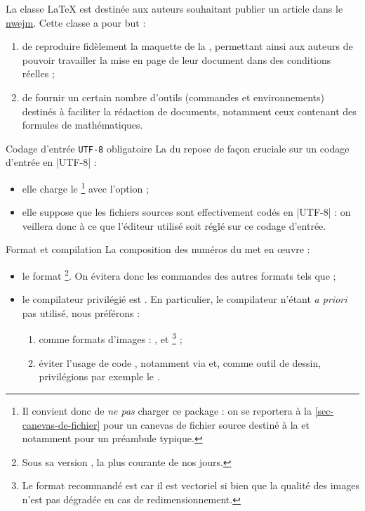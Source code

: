 \documentclass[french,nolocaltoc]{nwejmart}
\newtheorem[title=Fait,style=definition]{fact}
\begin{document}
La classe \LaTeX{} \nwejmauthor{} est destinée aux auteurs souhaitant publier un
article dans le \href{http://math.univ-lille1.fr/~nwejm/}{\gls{nwejm}}. Cette
classe a pour but :
\begin{enumerate}
\item de reproduire fidèlement la maquette de la \nwejm{}, permettant ainsi
  aux auteurs de pouvoir travailler la mise en page de leur document dans des
  conditions réelles ;
\item de fournir un certain nombre d'outils (commandes et environnements)
  destinés à faciliter la rédaction de documents, notamment ceux contenant des
  formules de mathématiques.
\end{enumerate}

\begin{dbwarning}{Codage d'entrée \protect\lstinline+UTF-8+ obligatoire}{}
  La \nwejmauthorcl{} du \nwejm{} repose de façon cruciale sur un codage
  d'entrée en |UTF-8| :
  \begin{itemize}
  \item elle charge le \footnote{%
      Il convient donc de \emph{ne pas} charger ce package : on se reportera
      à la \vref{sec-canevas-de-fichier} pour un canevas de fichier source
      destiné à la \nwejm{} et notamment pour un préambule typique.%
    }
    avec l'option  ;
  \item elle suppose que les fichiers sources  sont effectivement
    codés en |UTF-8| : on veillera donc à ce que l'éditeur utilisé soit réglé
    sur ce codage d'entrée.
  \end{itemize}
\end{dbwarning}

\begin{dbwarning}{Format et compilation }{}
  La composition des numéros du \nwejm*{} met en œuvre :
  \begin{itemize}
  \item le format \footnote{Sous sa version , la
      plus courante de nos jours.}. On évitera donc les commandes des autres
    formats tels que  ;
  \item le compilateur privilégié est . En particulier, le
    compilateur  n'étant \emph{a priori} pas utilisé, nous
    préférons :
    \begin{enumerate}
    \item comme formats d'images : ,  et
      \footnote{Le format recommandé est  car il est
        vectoriel si bien que la qualité des images n'est pas dégradée en cas de
        redimensionnement.} ;
    \item éviter l'usage de code , notamment via
       et, comme outil de dessin, privilégions par exemple le
      .
    \end{enumerate}
  \end{itemize}
\end{dbwarning}
\end{document}
